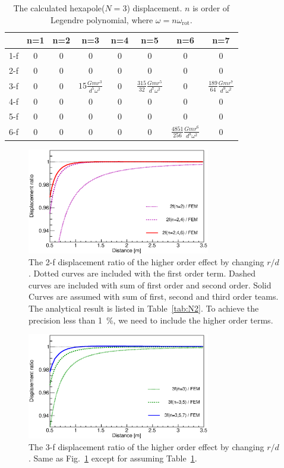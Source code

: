 \documentclass[%
 reprint,
superscriptaddress,
 amsmath,amssymb,
 aps,
]{revtex4-1}
\begin{document}
\begin{table}
\begin{center}
\caption{The calculated hexapole($N=3$) displacement. $n$ is order of Legendre polynomial, where $\omega=n\omega_{\mathrm{rot}}$.  \label{tab:N3}}
\footnotesize
\begin{tabular}{cccccccc}
\hline
& n=1 & n=2& n=3 &n=4&n=5&n=6&n=7 \\
\hline
1-f&0&0&0&0&0&0&0 \\
2-f&0&0&0&0&0&0&0  \\
3-f&0&0&$15\frac{Gmr^3}{d^5\omega^2}$&0&$\frac{315}{32}\frac{Gmr^5}{d^7\omega^2}$&0& $\frac{189}{64} \frac{Gmr^7}{d^9 \omega^2}$\\
4-f&0&0&0&0&0&0&0 \\
5-f&0&0&0&0&0&0&0 \\
6-f&0&0&0&0&0&$\frac{4851}{256} \frac{Gmr^6}{d^8\omega^2}$&0  \\
\hline
\end{tabular}
\end{center}
\end{table}

\begin{figure}
\begin{center}
\includegraphics[width=8cm]{2f.eps}
\caption{The 2-f displacement ratio of the higher order effect by changing $r/d$. Dotted curves are included with the first order term. Dashed curves are included with sum of first order and second order. Solid Curves are assumed with sum of first, second and third order teams. The analytical result is listed in Table~\ref{tab:N2}. To achieve the precision less than 1~\%, we need to include the higher order terms.}
\label{fig:FEM-2f}
\end{center}
\end{figure}

\begin{figure}
\begin{center}
\includegraphics[width=8cm]{3f.eps}
\caption{The 3-f displacement ratio of the higher order effect by changing $r/d$. Same as Fig.~\ref{fig:FEM-2f} except for assuming Table~\ref{tab:N3}. }
\label{fig:FEM-3f}
\end{center}
\end{figure}
\end{document}
